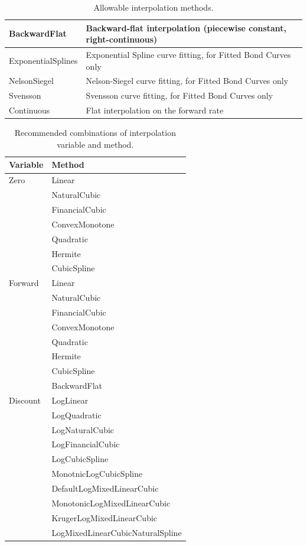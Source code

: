 \begin{table}[H]
\begin{tabular}{|l|p{9cm}|}
    BackwardFlat & Backward-flat interpolation (piecewise constant, right-continuous) \\ \hline
    ExponentialSplines & Exponential Spline curve fitting, for Fitted Bond Curves only \\ \hline
    NelsonSiegel & Nelson-Siegel curve fitting, for Fitted Bond Curves only \\ \hline
    Svensson & Svensson curve fitting, for Fitted Bond Curves only \\ \hline
    Continuous & Flat interpolation on the forward rate \\ \hline
  \end{tabular}
  \caption{Allowable interpolation methods.}
  \label{tab:allow_interp_methods}
\end{table}

\begin{table}[H]
\centering
\begin{tabular}{|l|l|}
    \hline
    {\bfseries Variable} & {\bfseries Method} \\
    \hline
    Zero        & Linear \\
                & NaturalCubic \\
                & FinancialCubic \\
                & ConvexMonotone \\
                & Quadratic \\
                & Hermite \\
                & CubicSpline \\ \hline
    Forward     & Linear \\
                & NaturalCubic \\
                & FinancialCubic \\
                & ConvexMonotone \\
                & Quadratic \\
                & Hermite \\
                & CubicSpline \\
                & BackwardFlat \\ \hline
    Discount    & LogLinear \\
                & LogQuadratic \\
                & LogNaturalCubic \\
                & LogFinancialCubic \\
                & LogCubicSpline \\
                & MonotnicLogCubicSpline \\
                & DefaultLogMixedLinearCubic \\
                & MonotonicLogMixedLinearCubic \\
                & KrugerLogMixedLinearCubic \\
                & LogMixedLinearCubicNaturalSpline \\ \hline
  \end{tabular}
  \caption{Recommended combinations of interpolation variable and method.}
  \label{tab:recommende_interp_var_methods}
\end{table}

